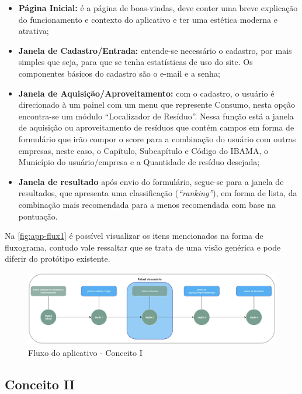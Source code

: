\begin{itemize} 
	\item \textbf{Página Inicial:} é a página de boas-vindas, deve conter uma breve explicação do funcionamento e contexto do aplicativo e ter uma estética moderna e atrativa;
	\item \textbf{Janela de Cadastro/Entrada:} entende-se necessário o cadastro, por mais simples que seja, para que se tenha estatísticas de uso do site. Os componentes básicos do cadastro são o e-mail e a senha; 
	\item \textbf{Janela de Aquisição/Aproveitamento:} com o cadastro, o usuário é direcionado à um painel com um menu que represente Consumo, nesta opção encontra-se um módulo “Localizador de Resíduo”. Nessa função está a janela de aquisição ou aproveitamento de resíduos que contém campos em forma de formulário que irão compor o score para a combinação do usuário com outras empresas, neste caso, o Capítulo, Subcapítulo e Código do \gls{IBAMA}, o Município do usuário/empresa e a Quantidade de resíduo desejada;
	\item \textbf{Janela de resultado} após envio do formulário, segue-se para a janela de resultados, que apresenta uma classificação (\textit{“ranking”}), em forma de lista, da combinação mais recomendada para a menos recomendada com base na pontuação.
\end{itemize}

Na \autoref{fig:app-flux1} é possível visualizar os itens mencionados na forma de fluxograma, contudo vale ressaltar que se trata de uma visão genérica e pode diferir do protótipo existente.

\begin{figure}[htb]
	\caption{\label{fig:app-flux1} Fluxo do aplicativo - Conceito I}
	\begin{center}
		\includegraphics[scale=0.33]{images/app-flux1.jpg}
	\end{center}
\end{figure}

\subsection{Conceito II}

